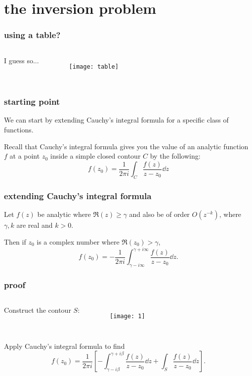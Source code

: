 \documentclass[mathserif]{beamer}
\newcommand{\sbr}[1]{\left[#1\right]}
\begin{document}
\section{the inversion problem}

\begin{frame}
  \frametitle{using a table?}

  \begin{columns}

    I guess so...
    \begin{figure}[h]
      \centering
      \texttt{[image: table]}
    \end{figure}
  \end{columns}

\end{frame}

\begin{frame}
  \frametitle{starting point}

  We can start by extending Cauchy's integral formula for a specific class of functions.

  \pause Recall that Cauchy's integral formula gives you the value of an analytic function $f$ at a point $z_0$ inside a simple closed contour $C$ by the following: \[f(z_0) = \frac{1}{2\pi i}\int_C \frac{f(z)}{z-z_0}\dd{z}\]

\end{frame}

\begin{frame}
  \frametitle{extending Cauchy's integral formula}

  \begin{theorem}
    Let $f(z)$ be analytic where $\Re(z) \geq \gamma$ and also be of order $O(z^{-k})$, where $\gamma, k$ are real and $k> 0$. 
    
    Then if $z_0$ is a complex number where $\Re(z_0) > \gamma$, \[f(z_0) = -\frac{1}{2\pi i}\int_{\gamma-i\infty}^{\gamma + i\infty}\frac{f(z)}{z-z_0}\dd{z}.\]
  \end{theorem}


\end{frame}

\begin{frame}
  \frametitle{proof}

  \begin{columns}

    Construct the contour $S$:
    \begin{figure}[h]
      \centering
      \texttt{[image: 1]}
    \end{figure}
  \end{columns}

  \pause Apply Cauchy's integral formula to find \[f(z_0) = \frac{1}{2\pi i}\sbr{-\int_{\gamma-i\beta}^{\gamma + i\beta}\frac{f(z)}{z-z_0}\dd{z} + \int_S\frac{f(z)}{z-z_0}\dd{z}}.\] 


\end{frame}
\end{document}
